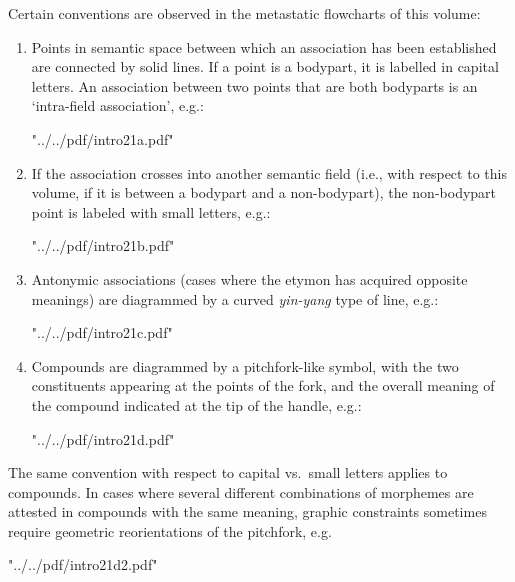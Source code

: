 Certain conventions are observed in the metastatic flowcharts of this volume:

\begin{enumerate}
\item Points in semantic space between which an association has been established
are connected by solid lines.  If a point is a bodypart, it is labelled in
capital letters.  An association between two points that are both bodyparts is
an ‘intra-field association’, e.g.:

\hspace*{0.7in} \XeTeXpdffile "../../pdf/intro21a.pdf"

\item If the association crosses into another semantic field (i.e., with respect
to this volume, if it is between a bodypart and a non-bodypart), the
non-bodypart point is labeled with small letters, e.g.:

\hspace*{0.7in} \XeTeXpdffile "../../pdf/intro21b.pdf" 

\item Antonymic associations (cases where the etymon has acquired opposite
meanings) are diagrammed by a curved \textit{yin-yang} type of line, e.g.:

\hspace*{0.7in} \XeTeXpdffile "../../pdf/intro21c.pdf"

\item Compounds are diagrammed by a pitchfork-like symbol, with the two
constituents appearing at the points of the fork, and the overall meaning of the
compound indicated at the tip of the handle, e.g.:

\hspace*{0.7in} \XeTeXpdffile "../../pdf/intro21d.pdf" 

\end{enumerate}

The same convention with respect to capital vs.\ small letters applies to
compounds. In cases where several different combinations of morphemes are attested in compounds with the same meaning, graphic constraints sometimes require geometric reorientations of the pitchfork, e.g.

\hspace*{1in} \XeTeXpdffile "../../pdf/intro21d2.pdf"

